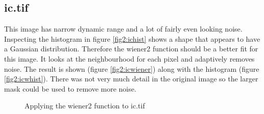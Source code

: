 \documentclass{article}
\begin{document}
\subsection*{ic.tif}
This image has narrow dynamic range and a lot of fairly even looking noise. Inspecting the histogram in figure \ref{fig2:ichist} shows a shape that appears to have a Gaussian distribution.  Therefore the wiener2 function should be a better fit for this image. It looks at the neighbourhood for each pixel and adaptively removes noise. The result is shown (figure \ref{fig2:icwiener}) along with the histogram (figure \ref{fig2:icwhist}). There was not very much detail in the original image so the larger mask could be used to remove more noise.
\begin{figure}[h]
\qquad
{}\qquad
{}
\caption{Applying the wiener2 function to ic.tif}
\label{q2:ic}
\end{figure}
\end{document}
